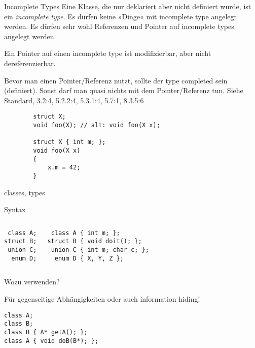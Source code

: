\begin{frame}[fragile]{Incomplete Types}
	Eine Klasse, die nur deklariert aber nicht definiert wurde, ist ein \emph{incomplete type}.
	Es dürfen keine »Dinge« mit incomplete type angelegt werden.
	Es dürfen sehr wohl Referenzen und Pointer auf incomplete types angelegt werden.
	
	Ein Pointer auf einen incomplete type ist modifizierbar, aber nicht dereferenzierbar.
	
	Bevor man einen Pointer/Referenz nutzt, sollte der type completed sein (definiert). Sonst darf man quasi nichts mit dem Pointer/Referenz tun. Siehe Standard, 3.2:4, 5.2.2:4, 5.3.1:4, 5.7:1, 8.3.5:6
	
	\begin{lstlisting}
		struct X;
		void foo(X); // alt: void foo(X x);
		
		struct X { int m; };
		void foo(X x)
		{
		    x.m = 42;
		}
	\end{lstlisting}
\end{frame}


\begin{frame}[fragile]{classes, types}
	\begin{block}{Syntax}
		\begin{columns}[t]
			\begin{lstlisting}
 class A;
struct B;
 union C;
  enum D;
			\end{lstlisting}
			
			\begin{lstlisting}
 class A { int m; };
struct B { void doit(); };
 union C { int m; char c; };
  enum D { X, Y, Z };
			\end{lstlisting}
		\end{columns}
	\end{block}
	
	\pause
	
	Wozu verwenden?
	\pause
	
	Für gegenseitige Abhängigkeiten oder auch information hiding!
	\begin{lstlisting}
class A;
class B;
class B { A* getA(); };
class A { void doB(B*); };
	\end{lstlisting}
\end{frame}

